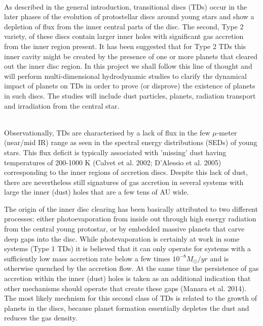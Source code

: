 \vspace{0.5em}
\\
As described in the general introduction, transitional discs (TDs) occur in the later phases of the evolution of
protostellar discs around young stars and show a depletion of flux from the inner central parts of the disc.
The second, Type 2 variety, of these discs contain larger inner holes with significant gas accretion from the inner
region present. It has been suggested that for Type 2 TDs this inner cavity might be
created by the presence of one or more planets that cleared out the inner disc region. 
In this project we shall follow this line of thought and will perform multi-dimensional hydrodynamic studies
to clarify the dynamical impact of planets on TDs in order to prove (or disprove) the existence of planets in such discs.
The studies will include dust particles, planets, radiation transport and irradiation from the central star.

\vspace{0.5em}
\\
Observationally, TDs are characterised by a lack of
flux in the few $\mu$-meter (near/mid IR) range as seen in the spectral energy distributions
(SEDs) of young stars. This flux deficit is typically associated with 
'missing' dust having temperatures of 200-1000 K (Calvet et al. 2002;
D'Alessio et al. 2005)
corresponding to the inner regions of accretion discs. Despite this lack of dust,
there are nevertheless still signatures of gas accretion in several systems with large the inner (dust) holes
that are a few tens of AU wide.

The origin of the inner disc clearing has been basically attributed to two different processes:
either photoevaporation from inside out through high energy radiation from the central young
protostar, or by embedded massive planets that carve deep gaps into the disc.
While photevaporation is certainly at work in some systems (Type 1 TDs) it is believed that it can only
operate for systems with a sufficiently low mass accretion rate below a few times $10^{-8} M_\odot/yr$
and is otherwise quenched by the accretion flow.
At the same time the persistence of gas accretion within the inner (dust) holes is taken as an additional
indication that other mechanisms should operate that create these gaps (Manara et al. 2014). 
The most likely mechnism for this second class of TDs is related to the growth of planets in the discs,
because planet formation essentially depletes the dust and reduces the gas density.


